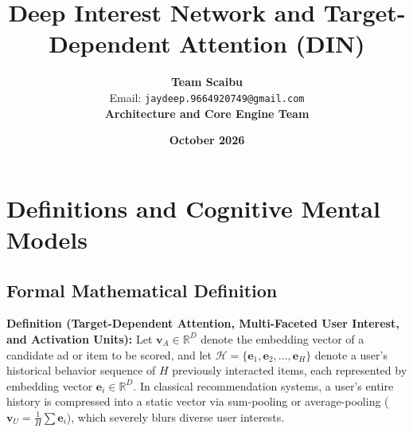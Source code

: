 \documentclass[11pt,a4paper]{article}
\title{\textbf{Deep Interest Network and Target-Dependent Attention (DIN)}}
\author{\textbf{Team Scaibu} \\ \small Email: \texttt{jaydeep.9664920749@gmail.com} \\ \small \textbf{Architecture and Core Engine Team}}
\date{\textbf{October 2026}}
\theoremstyle{definition}
\begin{document}
\maketitle

\section{Definitions and Cognitive Mental Models}

\subsection{Formal Mathematical Definition}
\textbf{Definition (Target-Dependent Attention, Multi-Faceted User Interest, and Activation Units):}
Let $\mathbf{v}_A \in \mathbb{R}^D$ denote the embedding vector of a candidate ad or item to be scored, and let $\mathcal{H} = \{\mathbf{e}_1, \mathbf{e}_2, \dots, \mathbf{e}_H\}$ denote a user's historical behavior sequence of $H$ previously interacted items, each represented by embedding vector $\mathbf{e}_i \in \mathbb{R}^D$. In classical recommendation systems, a user's entire history is compressed into a static vector via sum-pooling or average-pooling ($\mathbf{v}_U = \frac{1}{H}\sum \mathbf{e}_i$), which severely blurs diverse user interests.
\end{document}

